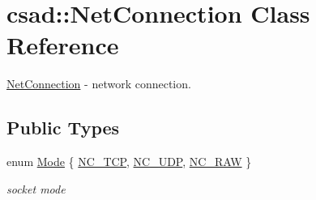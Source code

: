 \hypertarget{classcsad_1_1_net_connection}{\section{csad\-:\-:Net\-Connection Class Reference}
\label{classcsad_1_1_net_connection}
}


\hyperlink{classcsad_1_1_net_connection}{Net\-Connection} -\/ network connection.  


\subsection*{Public Types}
\begin{DoxyCompactItemize}
\item 
enum \hyperlink{classcsad_1_1_net_connection_a3b8242f34d97fe051d6eab451b6db3b5}{Mode} \{ \hyperlink{classcsad_1_1_net_connection_a3b8242f34d97fe051d6eab451b6db3b5a47d79c745230e16a4402daabece4788b}{N\-C\-\_\-\-T\-C\-P}, 
\hyperlink{classcsad_1_1_net_connection_a3b8242f34d97fe051d6eab451b6db3b5a9bc0746a60d6a49de4c09e67586ad7d9}{N\-C\-\_\-\-U\-D\-P}, 
\hyperlink{classcsad_1_1_net_connection_a3b8242f34d97fe051d6eab451b6db3b5a67c9b49521cbc221e928764cf96dbf4d}{N\-C\-\_\-\-R\-A\-W}
 \}
\begin{DoxyCompactList}\small\item\em socket mode \end{DoxyCompactList}\end{DoxyCompactItemize}
